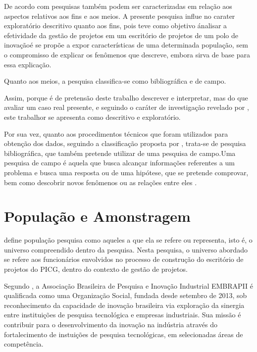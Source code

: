 De acordo com  pesquisas também podem ser caracterizadas em relação aos aspectos relativos aos fins e aos meios. A presente pesquisa influe no carater exploratório descritivo quanto aos fins, pois teve como objetivo \'analisar a efetividade da gestão de projetos em um escritório de projetos de um polo de inovação\' e se propõe a expor características de uma determinada população, sem o compromisso de explicar os fenômenos que descreve, embora sirva de base para essa explicação.

Quanto aos meios, a pesquisa classifica-se como bibliográfica e de campo.

Assim, porque é de pretensão deste trabalho descrever e interpretar, mas do que avaliar um caso real presente, e seguindo o caráter de investigação revelado por , este trabalhor se apresenta como descritivo e exploratório.

Por sua vez, quanto aos procedimentos técnicos que foram utilizados para obtenção dos dados, seguindo a classificação proposta por , trata-se de pesquisa bibliográfica, que também pretende utilizar de uma pesquisa de campo.Uma pesquisa de campo é aquela que busca alcançar informações referentes a um problema e busca uma resposta ou de uma hipótese, que se pretende comprovar, bem como descobrir novos fenômenos ou as relações entre eles \cite{de2007metodologia}.


\section{População e Amonstragem}

 define população pesquisa como aqueles a que ela se refere ou representa, isto é, o universo compreendido dentro da pesquisa. Nesta pesquisa, o universo abordado se refere aos funcionários envolvidos no processo de construção do escritório de projetos do PICG, dentro do contexto de gestão de projetos.

Segundo , a Associação Brasileira de Pesquisa e Inovação Industrial EMBRAPII é qualificada como uma Organização Social, fundada desde setembro de 2013, sob reconhecimento da capacidade de inovação brasileira via exploração da sinergia entre instituições de pesquisa tecnológica e empresas industriais. Sua missão é contribuir para o desenvolvimento da inovação na indústria através do fortalecimento de instuições de pesquisa tecnológicas, em selecionadas áreas de competência.

